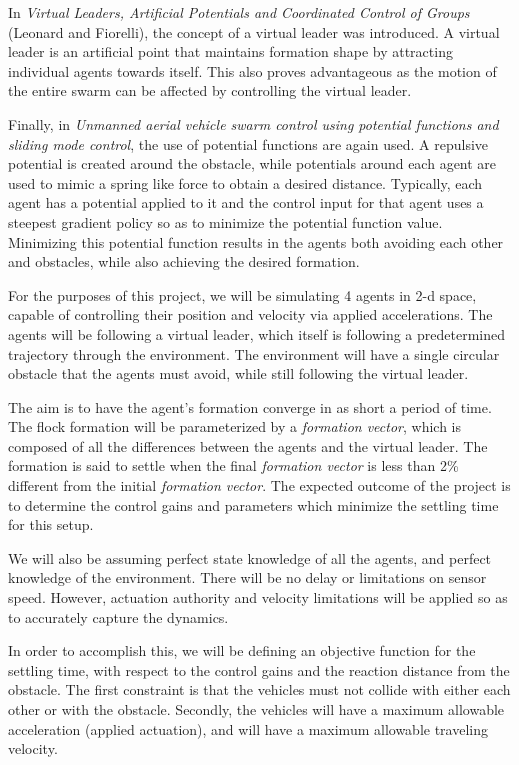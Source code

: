 \documentclass[11pt]{article}
\begin{document}
In \textit{Virtual Leaders, Artificial Potentials and Coordinated Control of Groups} (Leonard and Fiorelli), the concept of a virtual leader was introduced.  A virtual leader is an artificial point that maintains formation shape by attracting individual agents towards itself.  This also proves advantageous as the motion of the entire swarm can be affected by controlling the virtual leader. 

Finally, in \textit{Unmanned aerial vehicle swarm control using potential functions and sliding mode control}, the use of potential functions are again used.  A repulsive potential is created around the obstacle, while potentials around each agent are used to mimic a spring like force to obtain a desired distance.  Typically, each agent has a potential applied to it and the control input for that agent uses a steepest gradient policy so as to minimize the potential function value.  Minimizing this potential function results in the agents both avoiding each other and obstacles, while also achieving the desired formation.

For the purposes of this project, we will be simulating 4 agents in 2-d space, capable of controlling their position and velocity via applied accelerations.  The agents will be following a virtual leader, which itself is following a predetermined trajectory through the environment.  The environment will have a single circular obstacle that the agents must avoid, while still following the virtual leader.

The aim is to have the agent's formation converge in as short a period of time.  The flock formation will be parameterized by a \textit{formation vector}, which is composed of all the differences between the agents and the virtual leader.  The formation is said to settle when the final \textit{formation vector} is less than 2\% different from the initial \textit{formation vector}.  The expected outcome of the project is to determine the control gains and parameters which minimize the settling time for this setup.

We will also be assuming perfect state knowledge of all the agents, and perfect knowledge of the environment.  There will be no delay or limitations on sensor speed.  However, actuation authority and velocity limitations will be applied so as to accurately capture the dynamics.

In order to accomplish this, we will be defining an objective function for the settling time, with respect to the control gains and the reaction distance from the obstacle.  The first constraint is that the vehicles must not collide with either each other or with the obstacle.  Secondly, the vehicles will have a maximum allowable acceleration (applied actuation), and will have a maximum allowable traveling velocity.
\end{document}
